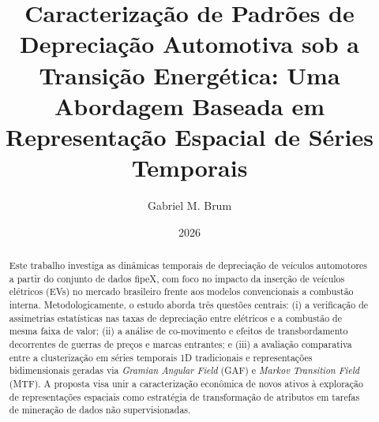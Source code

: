 \documentclass{article}
\title{Caracterização de Padrões de Depreciação Automotiva sob a Transição Energética: Uma Abordagem Baseada em Representação Espacial de Séries Temporais}
\author{Gabriel M. Brum}
\date{2026}
\begin{document}
\maketitle

\begin{abstract}
Este trabalho investiga as dinâmicas temporais de depreciação de veículos automotores a partir do conjunto de dados fipeX, com foco no impacto da inserção de veículos elétricos (EVs) no mercado brasileiro frente aos modelos convencionais a combustão interna. Metodologicamente, o estudo aborda três questões centrais: (i) a verificação de assimetrias estatísticas nas taxas de depreciação entre elétricos e a combustão de mesma faixa de valor; (ii) a análise de co-movimento e efeitos de transbordamento decorrentes de guerras de preços e marcas entrantes; e (iii) a avaliação comparativa entre a clusterização em séries temporais 1D tradicionais e representações bidimensionais geradas via \textit{Gramian Angular Field} (GAF) e \textit{Markov Transition Field} (MTF). A proposta visa unir a caracterização econômica de novos ativos à exploração de representações espaciais como estratégia de transformação de atributos em tarefas de mineração de dados não supervisionadas.
\end{abstract}

















\end{document}
